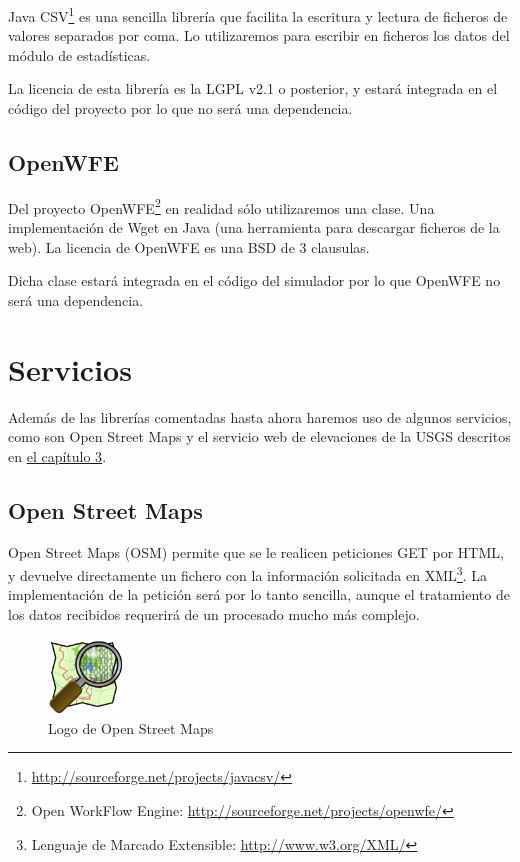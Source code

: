 Java CSV\footnote{\url{http://sourceforge.net/projects/javacsv/}} es una
sencilla librería que facilita la escritura y lectura de ficheros de valores
separados por coma. Lo utilizaremos para escribir en ficheros los datos del
módulo de estadísticas.

La licencia de esta librería es la LGPL v2.1 o posterior, y estará integrada en
el código del proyecto por lo que no será una dependencia.

\subsection{OpenWFE}

Del proyecto OpenWFE\footnote{Open WorkFlow Engine:
\url{http://sourceforge.net/projects/openwfe/}} en realidad sólo utilizaremos
una clase. Una implementación de Wget en Java (una herramienta para descargar
ficheros de la web). La licencia de OpenWFE es una BSD de 3 clausulas.

Dicha clase estará integrada en el código del simulador por lo que OpenWFE no
será una dependencia.

\section{Servicios}

Además de las librerías comentadas hasta ahora haremos uso de algunos
servicios, como son Open Street Maps y el servicio web de elevaciones de la
USGS descritos en \hyperref[cap3]{el capítulo 3}.

\subsection{Open Street Maps}

Open Street Maps (OSM)\cite{Pinto09} permite que se le realicen peticiones GET
por HTML, y
devuelve directamente un fichero con la información solicitada en
XML\footnote{Lenguaje de Marcado Extensible: \url{http://www.w3.org/XML/}}. La
implementación de la petición será por lo tanto sencilla, aunque el tratamiento
de los datos recibidos requerirá de un procesado mucho más complejo.

\begin{figure}[H]
 \centering
 \includegraphics[width=20mm]{figuras/cap4/osm.png}
 \caption{Logo de Open Street Maps}
\end{figure}
\pagebreak
